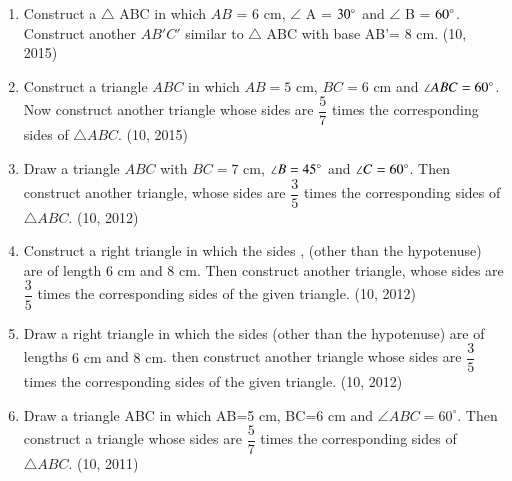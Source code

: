 \begin{enumerate}[label=\thesubsection.\arabic*,ref=\thesubsection.\theenumi]
     \item Construct a $\triangle$ ABC in which  $AB$ = $6$ cm, $\angle$ A = $30\degree $ and $\angle$ B = $60\degree$. Construct another  $ AB'C'$ similar to $\triangle$ ABC with base AB'= $8$ cm.
		\hfill (10, 2015)
\item Construct a triangle $ABC$ in which $AB = 5$ cm, $BC = 6$ cm and $\angle ABC = 60\degree$. Now construct another triangle whose sides are $\dfrac{5}{7}$ times the corresponding sides of $\triangle ABC$.
		\hfill (10, 2015)
\item Draw a triangle $ABC$ with $BC = 7 \text{ cm}$, $\angle B = 45 \degree$ and $\angle C = 60 \degree$. Then construct another triangle, whose sides are $\dfrac{3}{5}$ times the corresponding sides of $\triangle ABC$. 
		\hfill (10, 2012)
\item Construct a right triangle in which the sides , (other than the hypotenuse) are of length $6\text{ cm}$ and $8\text{ cm}$. Then construct another triangle, whose sides are $\dfrac{3}{5}$ times the corresponding sides of the given triangle. 
		\hfill (10, 2012)
\item Draw a right triangle in which the sides (other than the hypotenuse) are of lengths $6\text{ cm}$ and $8\text{ cm}$. then construct another triangle whose sides are $\dfrac{3}{5}$ times the corresponding sides of the given triangle. 
		\hfill (10, 2012)
    \item Draw a triangle ABC in which AB=5 cm, BC=6 cm and $\angle ABC=60^\circ$. Then construct a triangle whose sides are $\dfrac{5}{7}$ times the corresponding sides of $\triangle ABC$.
		\hfill (10, 2011)
\end{enumerate}
